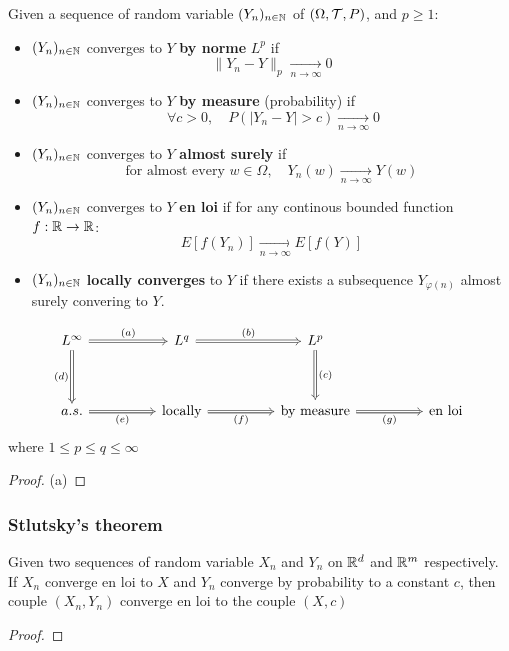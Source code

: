 \documentclass[en,geye,blue,normal,12pt,bibend=bibtex]{elegantnote}
\begin{document}
\begin{definition}
    Given a sequence of random variable \((Y_n)_{n \in \mathbb{N}}\) of \((\Omega, \mathcal{T}, P)\), and \(p \geq 1\):
    \begin{itemize}
        \item \((Y_n)_{n \in \mathbb{N}}\) converges to \(Y\) \textbf{by norme} \(L^p\) if \[\|Y_n-Y\|_p \xrightarrow[n \rightarrow \infty]{} 0\]
        \item \((Y_n)_{n \in \mathbb{N}}\) converges to \(Y\) \textbf{by measure} (probability) if \[\ \forall c>0, \quad P(|Y_n-Y|>c) \xrightarrow[n \rightarrow \infty]{} 0 \]
        \item \((Y_n)_{n \in \mathbb{N}}\) converges to \(Y\) \textbf{almost surely} if \[ \text{for almost every } w \in \Omega, \quad Y_n(w) \xrightarrow[n \rightarrow \infty]{} Y(w)\]
        \item \((Y_n)_{n \in \mathbb{N}}\) converges to \(Y\) \textbf{en loi} if for any continous bounded function \(f: \mathbb{R} \to \mathbb{R}\): \[E[f(Y_n)] \xrightarrow[n \rightarrow \infty]{} E[f(Y)] \]
        \item \((Y_n)_{n \in \mathbb{N}}\)  \textbf{locally converges} to \(Y\) if there exists a subsequence \(Y_{\varphi(n)}\) almost surely convering to \(Y\).     
    \end{itemize}
\end{definition}

\begin{proposition}
\[
\begin{tikzcd}
    {L^\infty} && {L^q} && {L^p} \\
    \\
    {a.s.} && {\text{locally}} && {\text{by measure}} && {\text{en loi}}
    \arrow[Rightarrow, "{(a)}", from=1-1, to=1-3]
    \arrow[Rightarrow, "{(d)}"', from=1-1, to=3-1]
    \arrow[Rightarrow, "{(b)}", from=1-3, to=1-5]
    \arrow[Rightarrow, "{(c)}", from=1-5, to=3-5]
    \arrow[Rightarrow, "{(e)}"', from=3-1, to=3-3]
    \arrow[Rightarrow, "{(f)}"', from=3-3, to=3-5]
    \arrow[Rightarrow, "{(g)}"', from=3-5, to=3-7]
\end{tikzcd}
\] where \(1 \leq p \leq q \leq \infty\) 

\begin{proof}
    (a) 
\end{proof}
\end{proposition}

\subsubsection{Stlutsky's theorem}
\begin{theorem}
    Given two sequences of random variable \(X_n\) and \(Y_n\) on \(\mathbb{R}^d\) and \(\mathbb{R}^m\) respectively. If \(X_n\) converge en loi to \(X\) and \(Y_n\) converge by probability to a constant \(c\), then couple \((X_n, Y_n)\) converge en loi to the couple \((X,c)\)

    \begin{proof}
        
    \end{proof}

\end{theorem}
\end{document}
